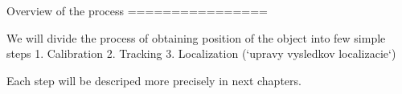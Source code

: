 Overview of the process
================

We will divide the process of obtaining position of the object into few simple steps
1. Calibration
2. Tracking
3. Localization
(`upravy vysledkov localizacie`)

Each step will be descriped more precisely in next chapters.
